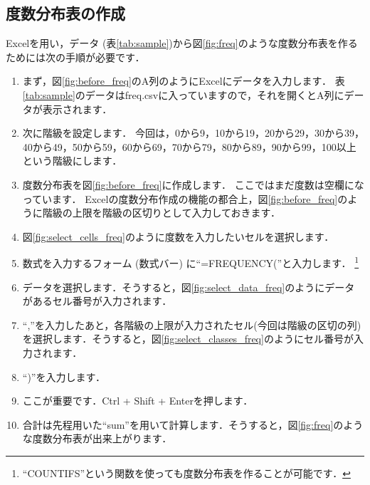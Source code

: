 \subsection{度数分布表の作成}
\label{sec:make_freq}

Excelを用い，データ (表\ref{tab:sample})から図\ref{fig:freq}のような度数分布表を作るためには次の手順が必要です．

\begin{enumerate}
    \item まず，図\ref{fig:before_freq}のA列のようにExcelにデータを入力します．
    表\ref{tab:sample}のデータはfreq.csvに入っていますので，それを開くとA列にデータが表示されます．
    \item 次に階級を設定します．
    今回は，0から9，10から19，20から29，30から39，40から49，50から59，60から69，70から79，80から89，90から99，100以上という階級にします．
    \item 度数分布表を図\ref{fig:before_freq}に作成します．
    ここではまだ度数は空欄になっています．
    Excelの度数分布作成の機能の都合上，図\ref{fig:before_freq}のように階級の上限を階級の区切りとして入力しておきます．
    \item 図\ref{fig:select_cells_freq}のように度数を入力したいセルを選択します．
    \item 数式を入力するフォーム (数式バー) に``=FREQUENCY(''と入力します．
    \footnote{``COUNTIFS''という関数を使っても度数分布表を作ることが可能です．}
    \item データを選択します．そうすると，図\ref{fig:select_data_freq}のようにデータがあるセル番号が入力されます．
    \item ``,''を入力したあと，各階級の上限が入力されたセル(今回は階級の区切の列)を選択します．そうすると，図\ref{fig:select_classes_freq}のようにセル番号が入力されます．
    \item ``)''を入力します．
    \item ここが重要です．Ctrl + Shift + Enterを押します．
    \item 合計は先程用いた``sum''を用いて計算します．そうすると，図\ref{fig:freq}のような度数分布表が出来上がります．
\end{enumerate}


